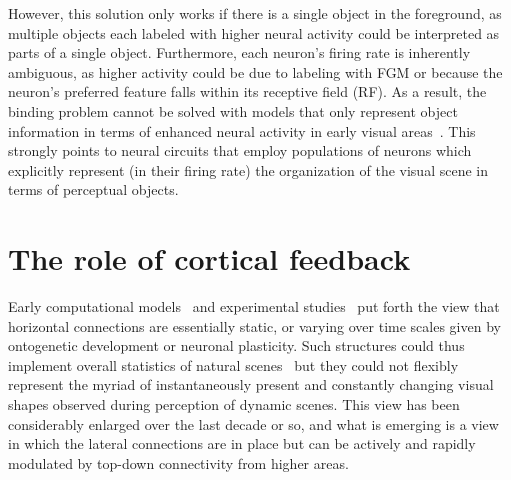 However, this solution only works if there is a single object in the foreground, as multiple objects each labeled with higher neural activity could be interpreted as parts of a single object. Furthermore, each neuron's firing rate is inherently ambiguous, as higher activity could be due to labeling with FGM or because the neuron's preferred feature falls within its receptive field (RF). As a result, the binding problem cannot be solved with models that only represent object information in terms of enhanced neural activity in early visual areas~\citep{Niebur00a}. This strongly points to neural circuits that employ populations of neurons which explicitly represent (\ie in their firing rate) the organization of the visual scene in terms of perceptual objects.

\section{The role of cortical feedback}

%
Early computational models~\citep{Stemmler_etal95b} and experimental studies~\citep{Simonotto_etal97,Polat_etal98,Chatterjee_etal11,Xie_etal14} put forth the view that horizontal connections
are essentially static, or varying over time scales given by ontogenetic development or neuronal plasticity. Such structures could thus implement overall statistics of natural scenes~\citep[like circular structures, e.g.][]{Sigman_etal01} but they could not flexibly represent the myriad of instantaneously present and constantly changing visual shapes observed during perception of dynamic scenes. This view has been considerably enlarged over the last decade or so, and what is emerging is a view in which the lateral connections are in place but can be actively and rapidly modulated by top-down connectivity from higher areas.

